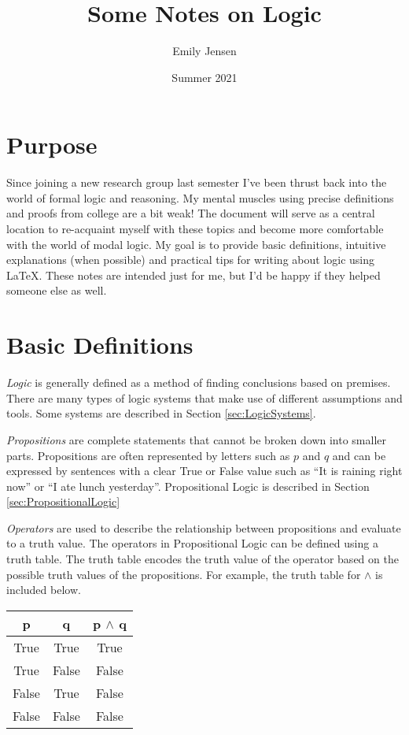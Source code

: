 \documentclass{article}
\title{Some Notes on Logic}
\author{Emily Jensen}
\date{Summer 2021}
\begin{document}
\maketitle

\section{Purpose}
Since joining a new research group last semester I've been thrust back into the world of formal logic and reasoning. My mental muscles using precise definitions and proofs from college are a bit weak! The document will serve as a central location to re-acquaint myself with these topics and become more comfortable with the world of modal logic. My goal is to provide basic definitions, intuitive explanations (when possible) and practical tips for writing about logic using \LaTeX. These notes are intended just for me, but I'd be happy if they helped someone else as well.

\section{Basic Definitions}

\textit{Logic} is generally defined as a method of finding conclusions based on premises. There are many types of logic systems that make use of different assumptions and tools. Some systems are described in Section \ref{sec:LogicSystems}.

\textit{Propositions} are complete statements that cannot be broken down into smaller parts. Propositions are often represented by letters such as $p$ and $q$ and can be expressed by sentences with a clear True or False value such as ``It is raining right now'' or ``I ate lunch yesterday''. Propositional Logic is described in Section \ref{sec:PropositionalLogic}

\textit{Operators} are used to describe the relationship between propositions and evaluate to a truth value. The operators in Propositional Logic can be defined using a truth table. The truth table encodes the truth value of the operator based on the possible truth values of the propositions. For example, the truth table for $\wedge$ is included below.

\begin{center}
    \begin{tabular}{c c | c}
        p & q & p $\wedge$ q \\
        \hline 
        True & True & {True} \\
        True & False & {False} \\
        False & True & {False} \\
        False & False & {False} \\
    \end{tabular}
\end{center}
\end{document}
